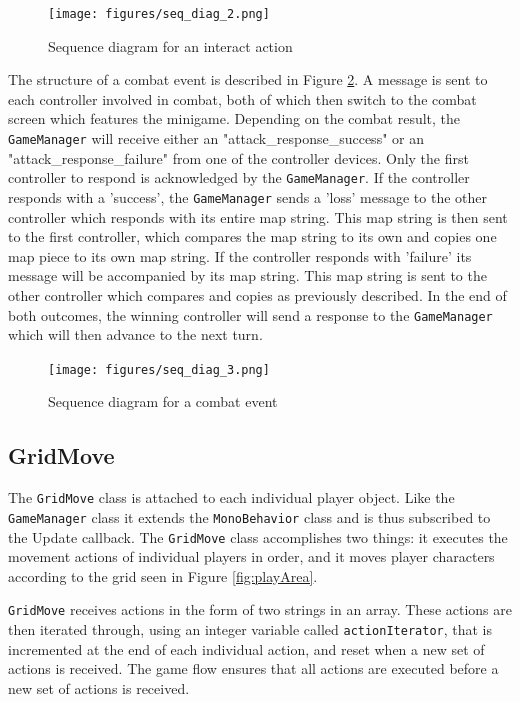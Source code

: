 \begin{figure}
	\centering
	\texttt{[image: figures/seq\_diag\_2.png]}
	\caption{Sequence diagram for an interact action \label{fig:seqDiag2}}
\end{figure}

The structure of a combat event is described in Figure \ref{fig:seqDiag3}. A message is sent to each controller involved in combat, both of which then switch to the combat screen which features the minigame. Depending on the combat result, the \texttt{GameManager} will receive either an "attack\_response\_success" or an "attack\_response\_failure" from one of the controller devices. Only the first controller to respond is acknowledged by the \texttt{GameManager}. If the controller responds with a 'success', the \texttt{GameManager} sends a 'loss' message to the other controller which responds with its entire map string. This map string is then sent to the first controller, which compares the map string to its own and copies one map piece to its own map string. If the controller responds with 'failure' its message will be accompanied by its map string. This map string is sent to the other controller which compares and copies as previously described. In the end of both outcomes, the winning controller will send a response to the \texttt{GameManager} which will then advance to the next turn.

\begin{figure}
	\centering
	\texttt{[image: figures/seq\_diag\_3.png]}
	\caption{Sequence diagram for a combat event \label{fig:seqDiag3}}
\end{figure}

\subsection{GridMove}
The \texttt{GridMove} class is attached to each individual player object. Like the \texttt{GameManager} class it extends the \texttt{MonoBehavior} class and is thus subscribed to the Update callback. The \texttt{GridMove} class accomplishes two things: it executes the movement actions of individual players in order, and it moves player characters according to the grid seen in Figure \ref{fig:playArea}. 

\texttt{GridMove} receives actions in the form of two strings in an array. These actions are then iterated through, using an integer variable called \texttt{actionIterator}, that is incremented at the end of each individual action, and reset when a new set of actions is received. The game flow ensures that all actions are executed before a new set of actions is received. 

